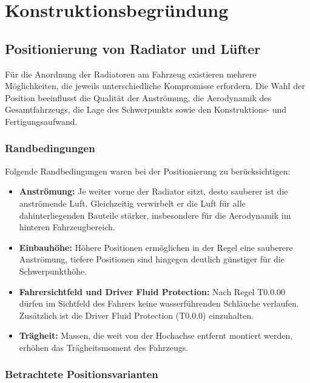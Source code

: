 \chapter{Konstruktionsbegründung}
\label{chap:konstruktionsbegruendung}

\section{Positionierung von Radiator und Lüfter}
\label{sec:Positionierung}

Für die Anordnung der Radiatoren am Fahrzeug existieren mehrere Möglichkeiten,
die jeweils unterschiedliche Kompromisse erfordern. Die Wahl der Position
beeinflusst die Qualität der Anströmung, die Aerodynamik des Gesamtfahrzeugs,
die Lage des Schwerpunkts sowie den Konstruktions- und Fertigungsaufwand.

\subsection{Randbedingungen}
\label{subsec:randbedingungen_position}

Folgende Randbedingungen waren bei der Positionierung zu berücksichtigen:

\begin{itemize}
    \item \textbf{Anströmung:} Je weiter vorne der Radiator sitzt, desto
          sauberer ist die anströmende Luft. Gleichzeitig verwirbelt er die
          Luft für alle dahinterliegenden Bauteile stärker, insbesondere für
          die Aerodynamik im hinteren Fahrzeugbereich.
    \item \textbf{Einbauhöhe:} Höhere Positionen ermöglichen in der Regel
          eine sauberere Anströmung, tiefere Positionen sind hingegen
          deutlich günstiger für die Schwerpunkthöhe.
    \item \textbf{Fahrersichtfeld und Driver Fluid Protection:} Nach
          Regel T0.0.00 dürfen im Sichtfeld des Fahrers keine
          wasserführenden Schläuche verlaufen. Zusätzlich ist die Driver
          Fluid Protection (T0.0.0) einzuhalten.
    \item \textbf{Trägheit:} Massen, die weit von der Hochachse entfernt
          montiert werden, erhöhen das Trägheitsmoment des Fahrzeugs.
\end{itemize}

\subsection{Betrachtete Positionsvarianten}
\label{subsec:positionsvarianten}

